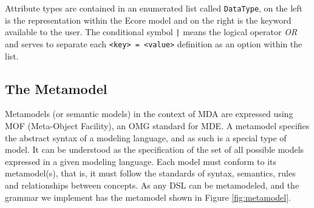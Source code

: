 Attribute types are contained in an enumerated list called \texttt{DataType}, on the left is the representation within the Ecore model and on the right is the keyword available to the user.
The conditional symbol \texttt{|} means the logical operator \textit{OR} and serves to separate each \texttt{<key> = <value>} definition as an option within the list.

\subsection{The Metamodel}

Metamodels (or semantic models) in the context of MDA are expressed using MOF (Meta-Object Facility), an OMG standard for MDE.
A metamodel specifies the abstract syntax of a modeling language, and as such is a special type of model.
It can be understood as the specification of the set of all possible models expressed in a given modeling language.
Each model must conform to its metamodel(s), that is, it must follow the standards of syntax, semantics, rules and relationships between concepts.
As any DSL can be metamodeled, and the grammar we implement has the metamodel shown in Figure \ref{fig:metamodel}.

%   

